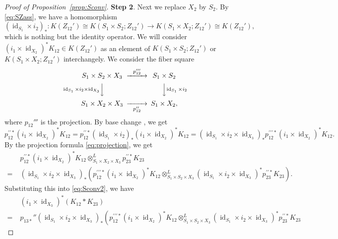 \documentclass[12pt]{amsart}
\theoremstyle{definition}
\theoremstyle{remark}
\numberwithin{equation}{subsection}
\newcommand{\propref}[1]{Proposition~\ref{#1}}
\newcommand{\id}{\operatorname{id}}
\begin{document}
\begin{proof}[Proof of \propref{prop:Sconv}]
{\bf Step 2}. Next we replace $X_2$ by $S_2$. By \eqref{eq:SZass}, we
have a homomorphism
\begin{equation*}
  (\id_{S_1}\times i_2)_*\colon K(Z_{12}')\cong
  K(S_1\times S_2; Z_{12}')\to
  K(S_1\times X_2; Z_{12}') \cong K(Z_{12}'),
\end{equation*}
which is nothing but the identity operator. We will consider
$(i_1\times\id_{X_2})^* K_{12}\in K(Z_{12}')$ as an element of
$K(S_1\times S_2; Z_{12}')$ or $K(S_1\times X_2; Z_{12}')$
interchangely. 
%
We consider the fiber square
\begin{equation*}
\begin{CD}
  S_1\times S_2 \times X_3 @>{p_{12}'''}>>
S_1\times S_2 \\
@V{\id_{S_1}\times i_2\times\id_{X_3}}VV @VV{\id_{S_1}\times i_2}V \\
S_1\times X_2\times X_3 @>>{p_{12}''}> S_1\times X_2,
\end{CD}
\end{equation*}
where $p_{12}'''$ is the projection.
By base change \cite[5.3.15]{Gi-book}, we get
\begin{equation*}
 p_{12}^{\prime\prime*}(i_1\times\id_{X_2})^* K_{12} = 
 p_{12}^{\prime\prime*}(\id_{S_1}\times i_2)_* (i_1\times\id_{X_2})^*
 K_{12}
 = (\id_{S_1}\times i_2\times \id_{X_3})_*
 p_{12}^{\prime\prime\prime*} (i_1\times\id_{X_2})^* K_{12}.
\end{equation*}
By the projection formula \eqref{eq:projection}, we get
\begin{equation*}
\begin{split}
  & p_{12}^{\prime\prime*}(i_1\times\id_{X_2})^* K_{12}
    \otimes^L_{S_1\times X_2\times X_3}
    p_{23}^{\prime\prime*} K_{23} \\
=\; & (\id_{S_1}\times i_2\times \id_{X_3})_* \left(
  p_{12}^{\prime\prime\prime*} (i_1\times\id_{X_2})^* K_{12}
  \otimes^L_{S_1\times S_2\times X_3} 
  (\id_{S_1}\times i_2\times \id_{X_3})^* p_{23}^{\prime\prime*}K_{23}
  \right).
\end{split}
\end{equation*}
Substituting this into \eqref{eq:Sconv2}, we have
\begin{equation}\label{eq:Sconv3}
\begin{split}
  & (i_1\times\id_{X_3})^* (K_{12} * K_{23})\\
 = \; &
  p_{13*}''(\id_{S_1}\times i_2\times \id_{X_3})_*\left(
  p_{12}^{\prime\prime\prime*} (i_1\times\id_{X_2})^* K_{12}
  \otimes^L_{S_1\times S_2\times X_3}
  (\id_{S_1}\times i_2\times \id_{X_3})^* p_{23}^{\prime\prime*}K_{23}

\end{split}
\end{equation}
\end{proof}
\end{document}
